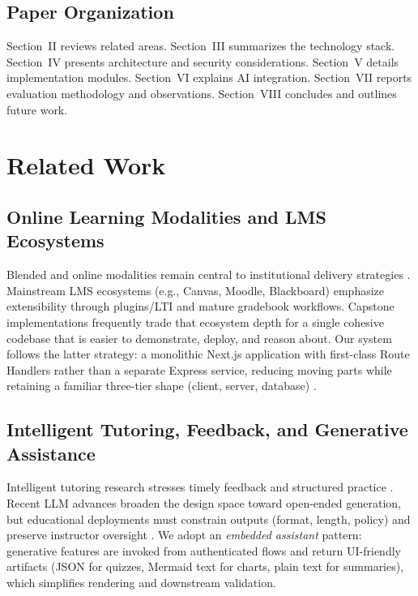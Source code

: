 \documentclass[conference]{IEEEtran}
\begin{document}
\subsection{Paper Organization}

Section~II reviews related areas. Section~III summarizes the technology stack. Section~IV presents architecture and security considerations. Section~V details implementation modules. Section~VI explains AI integration. Section~VII reports evaluation methodology and observations. Section~VIII concludes and outlines future work.

\section{Related Work}

\subsection{Online Learning Modalities and LMS Ecosystems}

Blended and online modalities remain central to institutional delivery strategies \cite{b1}. Mainstream LMS ecosystems (e.g., Canvas, Moodle, Blackboard) emphasize extensibility through plugins/LTI and mature gradebook workflows. Capstone implementations frequently trade that ecosystem depth for a single cohesive codebase that is easier to demonstrate, deploy, and reason about. Our system follows the latter strategy: a monolithic Next.js application with first-class Route Handlers rather than a separate Express service, reducing moving parts while retaining a familiar three-tier shape (client, server, database) \cite{b4}.

\subsection{Intelligent Tutoring, Feedback, and Generative Assistance}

Intelligent tutoring research stresses timely feedback and structured practice \cite{b2}. Recent LLM advances broaden the design space toward open-ended generation, but educational deployments must constrain outputs (format, length, policy) and preserve instructor oversight \cite{b3}. We adopt an \textit{embedded assistant} pattern: generative features are invoked from authenticated flows and return UI-friendly artifacts (JSON for quizzes, Mermaid text for charts, plain text for summaries), which simplifies rendering and downstream validation.
\end{document}
